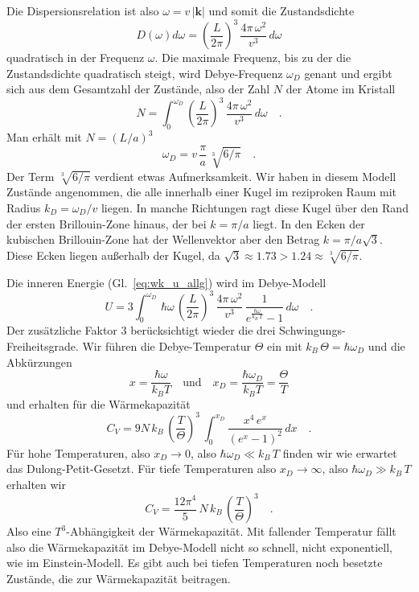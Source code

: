 Die Dispersionsrelation ist also $\omega = v \, | \mathbf{k} |$ und somit die Zustandsdichte
\begin{equation}
D(\omega) d\omega = \left( \frac{L}{2 \pi} \right)^3 \,     \frac{ 4 \pi \, \omega^2 }{v^3}   \, d\omega \label{eq:wk_debye_dos}
\end{equation} 
quadratisch in der Frequenz $\omega$. Die maximale Frequenz, bis zu der die Zustandsdichte quadratisch steigt, wird Debye-Frequenz $\omega_D$ genant und ergibt sich aus dem Gesamtzahl der Zustände, also der Zahl $N$ der Atome im Kristall
\begin{equation}
N = \int_0^{\omega_{D}}  \left( \frac{L}{2 \pi} \right)^3 \,     \frac{ 4 \pi \, \omega^2 }{v^3}   \, d\omega  \quad .
\end{equation}
Man erhält mit $N = (L / a)^3$
\begin{equation}
\omega_{D} = v \, \frac{\pi}{a} \, \sqrt[3]{6 / \pi} \quad .
\end{equation}
Der Term $\sqrt[3]{6 / \pi}$ verdient etwas Aufmerksamkeit. Wir haben in diesem Modell Zustände angenommen, die alle innerhalb einer Kugel im reziproken Raum mit Radius $k_{D} = \omega_{D} / v$ liegen. In manche Richtungen ragt diese Kugel über den Rand der ersten Brillouin-Zone hinaus, der bei $k = \pi / a$ liegt. In den  Ecken der kubischen Brillouin-Zone hat der Wellenvektor  aber den Betrag $k = \pi / a \sqrt{3}$. Diese Ecken liegen außerhalb der Kugel, da $\sqrt{3} \approx 1.73 > 1.24 \approx \sqrt[3]{6 / \pi}$.


Die inneren Energie (Gl.~\ref{eq:wk_u_allg}) wird im Debye-Modell
\begin{equation}
U = 3 \int_0^{\omega_D} \, \hbar \omega \,  \left( \frac{L}{2 \pi} \right)^3 \,     \frac{ 4 \pi \, \omega^2 }{v^3}  \,
\frac{1}{e^{\frac{\hbar \omega}{k_B \, T} }- 1} \, d\omega \quad .
\end{equation}
Der zusätzliche Faktor 3 berücksichtigt wieder die drei Schwingungs-Freiheitsgrade. Wir führen die Debye-Temperatur $\Theta$ ein mit $k_B \, \Theta = \hbar \omega_D$ und die Abkürzungen
\begin{equation}
x = \frac{\hbar \omega}{k_B T} \quad \text{und} \quad
x_D = \frac{\hbar \omega_D}{k_B T}  = \frac{\Theta}{T}
\end{equation}
und erhalten für die Wärmekapazität
\begin{equation}
C_V = 9 N \, k_B \, \left(\frac{T}{\Theta} \right)^3 \,
\int_0^{x_D} \frac{x^4 \, e^x}{\left(  e^x - 1 \right)^2} \, dx \quad .
\end{equation}
Für hohe Temperaturen, also $x_D \rightarrow 0$, also $\hbar  \omega_D \ll k_B \, T$ finden wir wie erwartet das Dulong-Petit-Gesetzt. Für tiefe Temperaturen also $x_D \rightarrow \infty$, also $\hbar  \omega_D \gg k_B \, T$  erhalten wir
\begin{equation}
C_V = \frac{12 \pi^4}{5} \, N \, k_B \, \left(\frac{T}{\Theta} \right)^3 \quad .
\end{equation}
Also eine $T^3$-Abhängigkeit der Wärmekapazität. Mit fallender Temperatur fällt also die Wärmekapazität im Debye-Modell nicht so schnell, nicht exponentiell, wie im Einstein-Modell. Es gibt auch bei tiefen Temperaturen noch besetzte Zustände, die zur Wärmekapazität beitragen.

